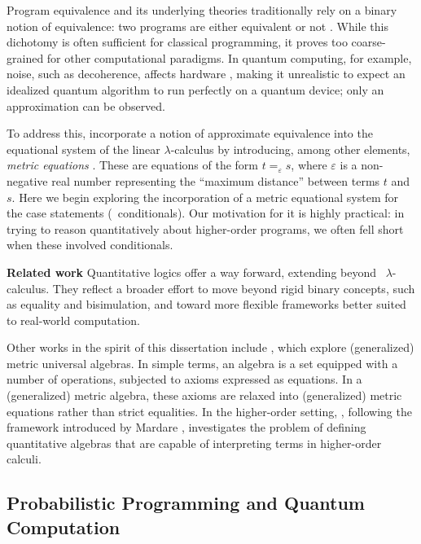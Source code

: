 Program equivalence and its underlying theories traditionally rely on a binary notion of equivalence: two programs are either equivalent or not \cite{winskel93}. While this dichotomy is often sufficient for classical programming, it proves too coarse-grained for other computational paradigms. In quantum computing, for example, noise, such as decoherence, affects hardware \cite{watrous2018theory,nielsen2010quantum,preskill2018quantum}, making it unrealistic to expect an idealized quantum algorithm to run perfectly on a quantum device; only an approximation can be observed. 


To address this, \cite{dahlqvistInternalLanguage2022,dahlqvist2023syntactic} incorporate a notion of approximate equivalence into the equational system of the linear $\lambda$-calculus by introducing, among other elements, \emph{metric equations} \cite{mardare2016quantitative, mardare2017axiomatizability}. These are equations of the form $t =_{\varepsilon} s$, where $\varepsilon$ is a non-negative real number representing the ``maximum distance'' between terms $t$ and $s$. Here we begin exploring the incorporation of a metric equational system for the case statements (\ie\ conditionals). Our motivation for it is highly practical: in trying to reason quantitatively about higher-order programs, we often fell short when these involved conditionals.

\textbf{Related work}
Quantitative logics offer a way forward, extending beyond  $\lambda$-calculus\cite{caoQuantitativeLogicSoft2010, fanQuantitativeLogicSoft2017}. They reflect a broader effort to move beyond rigid binary concepts, such as equality and bisimulation, and toward more flexible frameworks better suited to real-world computation.

Other works in the spirit of this dissertation include \cite{mardare2016quantitative, mardare2017axiomatizability, mio24, jurka24}, which explore (generalized) metric universal algebras. In simple terms, an algebra is a set equipped with a number of operations, subjected to axioms expressed as equations. In a (generalized) metric algebra, these axioms are relaxed into (generalized) metric equations rather than strict equalities. In the higher-order setting, \cite{lago22}, following the framework introduced by Mardare \cite{mardare2016quantitative}, investigates the problem of defining quantitative algebras that are capable of interpreting terms in higher-order calculi. 


\subsection*{Probabilistic Programming and Quantum Computation }

